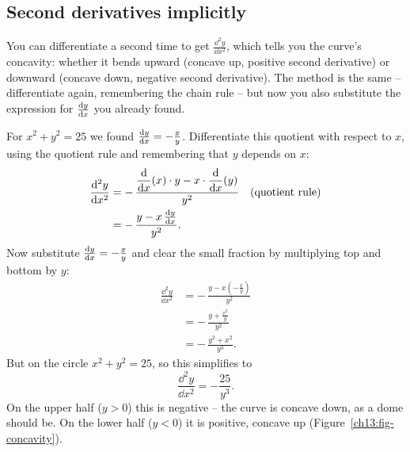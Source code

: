 \subsection{Second derivatives implicitly}

You can differentiate a second time to get $\frac{\dd^2 y}{\dd x^2}$, which tells you the curve's
concavity: whether it bends upward (concave up, positive second derivative) or downward (concave
down, negative second derivative). The
method is the same -- differentiate again, remembering the chain rule -- but now you also substitute
the expression for $\frac{\mathrm{d} y}{\mathrm{d} x}$ you already found.

\begin{example}
\label{ch13:ex-second}
For $x^2+y^2=25$ we found $\frac{\mathrm{d} y}{\mathrm{d} x} = -\frac{x}{y}$. Differentiate this quotient with respect to
$x$, using the quotient rule and remembering that $y$ depends on $x$:
\begin{align*}
\frac{\mathrm{d}^2 y}{\mathrm{d} x^2}
&= -\,\frac{\dfrac{\mathrm{d}}{\mathrm{d} x}(x)\cdot y - x\cdot\dfrac{\mathrm{d}}{\mathrm{d} x}(y)}{y^2}
 && \text{(quotient rule)} \\
&= -\,\frac{y - x\,\frac{\mathrm{d} y}{\mathrm{d} x}}{y^2}.
\end{align*}
Now substitute $\frac{\mathrm{d} y}{\mathrm{d} x} = -\tfrac{x}{y}$ and clear the small fraction by multiplying top and
bottom by $y$:
\begin{align*}
\frac{\dd^2 y}{\dd x^2}
&= -\,\frac{y - x\left(-\tfrac{x}{y}\right)}{y^2} \\
&= -\,\frac{y + \tfrac{x^2}{y}}{y^2} \\
&= -\,\frac{y^2 + x^2}{y^3}.
\end{align*}
But on the circle $x^2 + y^2 = 25$, so this simplifies to
\[
\frac{\dd^2 y}{\dd x^2} = -\frac{25}{y^3}.
\]
On the upper half ($y>0$) this is negative -- the curve is concave down, as a dome should be. On the
lower half ($y<0$) it is positive, concave up (Figure~\ref{ch13:fig-concavity}).
\end{example}

